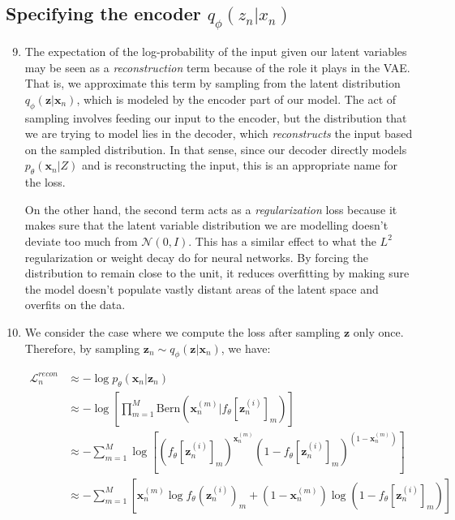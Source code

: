 \documentclass{article}
\begin{document}
\subsection{Specifying the encoder $q_{\phi}(z_n | x_n)$}

\begin{enumerate}[label=\textbf{1.\arabic*}]
  \setcounter{enumi}{8}
  \item
  The expectation of the log-probability of the input given our latent variables may be seen as a \textit{reconstruction} term because of the role it plays in the VAE. That is, we approximate this term by sampling from the latent distribution $q_{\phi}(\bm{z}|\bm{x}_n)$, which is modeled by the encoder part of our model. The act of sampling involves feeding our input to the encoder, but the distribution that we are trying to model lies in the decoder, which \textit{reconstructs} the input based on the sampled distribution. In that sense, since our decoder directly models $p_{\theta}(\bm{x}_n|Z)$ and is reconstructing the input, this is an appropriate name for the loss.

  On the other hand, the second term acts as a \textit{regularization} loss because it makes sure that the latent variable distribution we are modelling doesn't deviate too much from $\mathcal{N}(0, I)$. This has a similar effect to what the $L^2$ regularization or weight decay do for neural networks. By forcing the distribution to remain close to the unit, it reduces overfitting by making sure the model doesn't populate vastly distant areas of the latent space and overfits on the data.

  \item
  We consider the case where we compute the loss after sampling $\bm{z}$ only once. Therefore, by sampling $\bm{z}_n \sim q_{\phi}(\bm{z}|\bm{x}_n)$, we have:

  \begin{align*}
    \mathcal{L}_n^{recon} &\approx - \log p_{\theta} (\bm{x}_n|\bm{z}_n) \\
    &\approx - \log \left[ \prod_{m=1}^M \text{Bern} \left( \bm{x}_n^{(m)} | f_{\theta} \left[ \bm{z}_n^{(i)} \right]_m \right) \right] \\
    &\approx - \sum_{m=1}^M \log \left[ \left( f_{\theta} \left[ \bm{z}_n^{(i)} \right]_m \right)^{\bm{x}_n^{(m)}} \left( 1 -  f_{\theta} \left[ \bm{z}_n^{(i)} \right]_m \right)^{(1 -  \bm{x}_n^{(m)})} \right] \\
    &\approx - \sum_{m=1}^M \left[ \bm{x}_n^{(m)} \log f_{\theta} \left( \bm{z}_n^{(i)} \right)_m + \left( 1 - \bm{x}_n^{(m)} \right) \log \left( 1 - f_{\theta} \left[ \bm{z}_n^{(i)} \right]_m \right) \right]
  \end{align*}


\end{enumerate}
\end{document}
